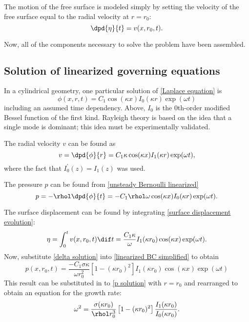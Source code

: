 \documentclass[ccbysa,note]{bmtreport}
\begin{document}
The motion of the free surface is modeled simply by setting the velocity of the free surface equal to the radial velocity at $r = r_0$:
\begin{equation}
   \dpd{\eta}{t} = v(x, r_0, t). \label{eq:surface displacement evolution}
\end{equation}

Now, all of the components necessary to solve the problem have been assembled.

\subsection{Solution of linearized governing equations}

In a cylindrical geometry, one particular solution of \eqref{Laplace equation} is
\begin{equation}
   \phi(x, r, t) = C_1 \cos(\kappa x) I_0(\kappa r) \exp(\omega t)
\end{equation}
including an assumed time dependency. Above, $I_0$ is the $0$th-order modified Bessel function of the first kind. Rayleigh theory is based on the idea that a single mode is dominant; this idea must be experimentally validated.

The radial velocity $v$ can be found as
\begin{equation}
   v = \dpd{\phi}{r} = C_1 \kappa \cos(\kappa x) I_1(\kappa r) \exp(\omega t),
\end{equation}
where the fact that $I_0^\prime(z) = I_1(z)$ was used.

The pressure $p$ can be found from \eqref{unsteady Bernoulli linearized}
\begin{equation}
   p = -\rhol \dpd{\phi}{t} = -C_1 \rhol \omega \cos(\kappa x) I_0(\kappa r) \exp(\omega t). \label{eq:p solution}
\end{equation}

The surface displacement can be found by integrating \eqref{surface displacement evolution}:
\begin{equation}
   \eta = \int_0^t v(x, r_0, t) \dif t = \frac{C_1 \kappa}{\omega} I_1(\kappa r_0) \cos(\kappa x) \exp(\omega t). \label{eq:delta solution}
\end{equation}
Now, substitute \eqref{delta solution} into \eqref{linearized BC simplified} to obtain
\begin{equation}
   p(x, r_0, t) = \frac{-C_1 \sigma \kappa}{\omega r_0^2} \left[1 - (\kappa r_0)^2\right] I_1(\kappa r_0) \cos(\kappa x) \exp(\omega t)
\end{equation}
This result can be substituted in to \eqref{p solution} with $r = r_0$ and rearranged to obtain an equation for the growth rate:
\begin{equation}
   \omega^2 = \frac{\sigma (\kappa r_0)}{\rhol r_0^3} \left[1 - (\kappa r_0)^2\right] \frac{I_1(\kappa r_0)}{I_0(\kappa r_0)}. \label{eq:Rayleigh growth rate exact}
\end{equation}
\end{document}
